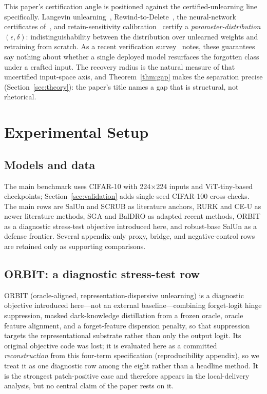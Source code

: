 \documentclass[11pt]{article}
\begin{document}
This paper's certification angle is positioned against the certified-unlearning line specifically. Langevin unlearning~\cite{chien2024langevin}, Rewind-to-Delete~\cite{mu2025rewind}, the neural-network certificates of~\cite{koloskova2025certified}, and retain-sensitivity calibration~\cite{heinzler2026retain} certify a \emph{parameter-distribution} $(\epsilon,\delta)$: indistinguishability between the distribution over unlearned weights and retraining from scratch. As a recent verification survey~\cite{xue2026survey} notes, these guarantees say nothing about whether a single deployed model resurfaces the forgotten class under a crafted input. The recovery radius is the natural measure of that uncertified input-space axis, and Theorem~\ref{thm:gap} makes the separation precise (Section~\ref{sec:theory}): the paper's title names a gap that is structural, not rhetorical.

\section{Experimental Setup}
\subsection{Models and data}
The main benchmark uses CIFAR-10 with 224$\times$224 inputs and ViT-tiny-based checkpoints; Section~\ref{sec:validation} adds single-seed CIFAR-100 cross-checks. The main rows are SalUn and SCRUB as literature anchors, RURK and CE-U as newer literature methods, SGA and BalDRO as adapted recent methods, ORBIT as a diagnostic stress-test objective introduced here, and robust-base SalUn as a defense frontier. Several appendix-only proxy, bridge, and negative-control rows are retained only as supporting comparisons.



\subsection{ORBIT: a diagnostic stress-test row}
ORBIT (oracle-aligned, representation-dispersive unlearning) is a diagnostic objective introduced here---not an external baseline---combining forget-logit hinge suppression, masked dark-knowledge distillation from a frozen oracle, oracle feature alignment, and a forget-feature dispersion penalty, so that suppression targets the representational substrate rather than only the output logit. Its original objective code was lost; it is evaluated here as a committed \emph{reconstruction} from this four-term specification (reproducibility appendix), so we treat it as one diagnostic row among the eight rather than a headline method. It is the strongest patch-positive case and therefore appears in the local-delivery analysis, but no central claim of the paper rests on it.
\end{document}
